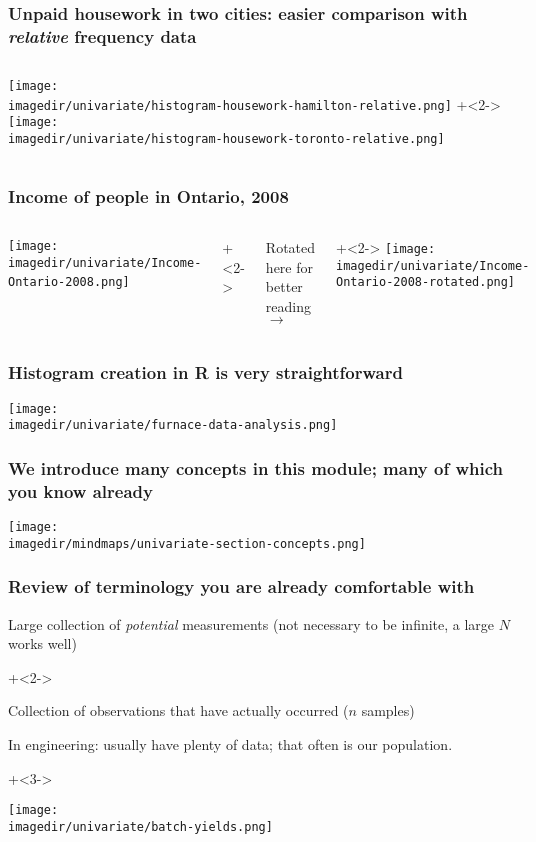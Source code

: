 \begin{frame}\frametitle{Unpaid housework in two cities: easier comparison with {\color{myOrange} \emph{relative}} frequency data}
	\begin{columns}
			\texttt{[image: \\imagedir/univariate/histogram-housework-hamilton-relative.png]}
			\onslide+<2->{
				\texttt{[image: \\imagedir/univariate/histogram-housework-toronto-relative.png]}
			}
	\end{columns}
\end{frame}

\begin{frame}\frametitle{Income of people in Ontario, 2008}
	\begin{columns}
		\column{0.5\textwidth}
			\texttt{[image: \\imagedir/univariate/Income-Ontario-2008.png]}\
			
			\onslide+<2->{
			
			\hfill Rotated here for better reading $\longrightarrow$
			}
		\column{0.5\textwidth}
			\onslide+<2->{
				\texttt{[image: \\imagedir/univariate/Income-Ontario-2008-rotated.png]}
			}
		
	\end{columns}
\end{frame}

\begin{frame}\frametitle{Histogram creation in R is very straightforward}
	\texttt{[image: \\imagedir/univariate/furnace-data-analysis.png]}
\end{frame}

\begin{frame}\frametitle{We introduce many concepts in this module; many of which you know already}
	\vspace{-16pt}
	\begin{center}
		\texttt{[image: \\imagedir/mindmaps/univariate-section-concepts.png]}
	\end{center}
\end{frame}

\begin{frame}\frametitle{Review of terminology you are already comfortable with}
	{\color{purple}{\textbf{Population}}}

	Large collection of \emph{potential} measurements (not necessary to be infinite, a large $N$ works well)

	\onslide+<2->{
	{\color{purple}{\textbf{Sample}}}

	Collection of observations that have actually occurred ($n$ samples)

	In engineering: usually have plenty of data; that often is our population.
	}

\onslide+<3->{
	\begin{center}
		\texttt{[image: \\imagedir/univariate/batch-yields.png]}
	\end{center}
}
\end{frame}

